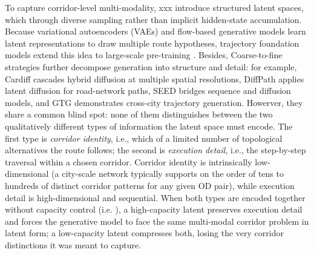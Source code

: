
To capture corridor-level multi-modality, xxx introduce structured latent spaces, which through diverse sampling rather than implicit hidden-state accumulation.
Because variational autoencoders (VAEs) and flow-based generative models learn latent representations to draw multiple route hypotheses\citep{kingma2014auto}, trajectory foundation models extend this idea to large-scale pre-training \citep{lin2024trajfm,unitraj2025,choudhury2024trajectorypowered,liu2025trajmamba}.
Besides, Coarse-to-fine strategies further decompose generation into structure and detail: for example, Cardiff \citep{guo2025cardiff} cascades hybrid diffusion at multiple spatial resolutions, DiffPath \citep{fan2024diffpath} applies latent diffusion for road-network paths, SEED \citep{rao2025seed} bridges sequence and diffusion models, and GTG \citep{wang2025gtg} demonstrates cross-city trajectory generation.
Howerver, they share a common blind spot: none of them distinguishes between the two qualitatively different types of information the latent space must encode.
The first type is \emph{corridor identity}, i.e., which of a limited number of topological alternatives the route follows; the second is \emph{execution detail}, i.e., the step-by-step traversal within a chosen corridor.
Corridor identity is intrinsically low-dimensional (a city-scale network typically supports on the order of tens to hundreds of distinct corridor patterns for any given OD pair), while execution detail is high-dimensional and sequential.
When both types are encoded together without capacity control (i.e. ), a high-capacity latent preserves execution detail and forces the generative model to face the same multi-modal corridor problem in latent form; a low-capacity latent compresses both, losing the very corridor distinctions it was meant to capture.

